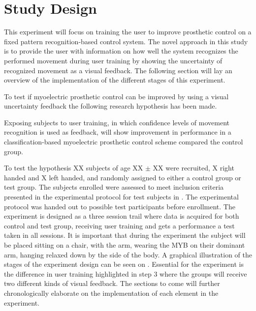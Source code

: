 \section{Study Design}

This experiment will focus on training the user to improve prosthetic control on a fixed pattern recognition-based control system. The novel approach in this study is to provide the user with information on how well the system recognizes the performed movement during user training by showing the uncertainty of recognized movement as a visual feedback. The following section will lay an overview of the implementation of the different stages of this experiment.

To test if myoelectric prosthetic control can be improved by using a visual uncertainty feedback the following research hypothesis has been made.  
\begin{center}
	Exposing subjects to user training, in which confidence levels of movement recognition is used as feedback, will show improvement in performance in a classification-based myoelectric prosthetic control scheme compared the control group.
\end{center}

To test the hypothesis XX subjects of age XX $\pm$ XX were recruited, X right handed and X left handed, and randomly assigned to either a control group or test group. The subjects enrolled were assessed to meet inclusion criteria presented in the experimental protocol for test subjects in . The experimental protocol was handed out to possible test participants before enrollment. The experiment is designed as a three session trail where data is acquired for both control and test group, receiving user training and gets a performance a test taken in all sessions. It is important that during the experiment the subject will be placed sitting on a chair, with the arm, wearing the MYB on their dominant arm, hanging relaxed down by the side of the body. A graphical illustration of the stages of the experiment design can be seen on . Essential for the experiment is the difference in user training highlighted in step 3 where the groups will receive two different kinds of visual feedback. The sections to come will further chronologically elaborate on the implementation of each element in the experiment.          
 

